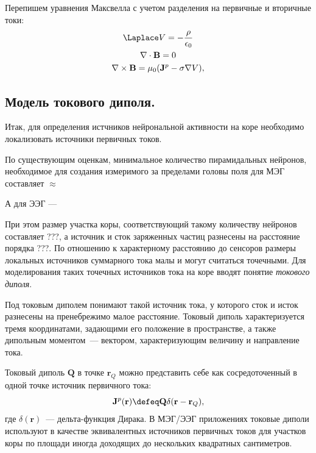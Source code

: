 Перепишем уравнения Максвелла с учетом разделения на первичные и вторичные токи:
\begin{gather}
    \Laplace V = -\frac{\rho}{\epsilon_0} \label{eq:max_quasi_prim_sec1} \\
    \nabla \cdot \mathbf{B} = 0 \label{eq:max_quasi_prim_sec2} \\
    \nabla \times \mathbf{B} = \mu_0 (\mathbf{J}^p - \sigma \nabla V) \label{eq:max_quasi_prim_sec3},
\end{gather}

\subsection{Модель токового диполя.}

Итак, для определения истчников нейрональной активности на коре необходимо
локализовать источники первичных токов.

По существующим оценкам, минимальное количество пирамидальных нейронов,
необходимое для создания измеримого за пределами головы поля для МЭГ составляет
$\approx$

А для ЭЭГ ---

При этом размер участка коры, соответствующий такому количеству нейронов
составляет ???, а источник и сток заряженных частиц разнесены на расстояние
порядка ???. По отношению к характерному расстоянию до сенсоров размеры
локальных источников суммарного тока малы и могут считаться точечными.  Для
моделирования таких точечных источников тока на коре вводят понятие
\emph{токового диполя}.

Под токовым диполем понимают такой источник тока, у которого сток и исток
разнесены на пренебрежимо малое расстояние.  Токовый диполь характеризуется
тремя координатами, задающими его положение в пространстве, а также дипольным
моментом~--- вектором, характеризующим величину и направление тока.

Токовый диполь $\mathbf{Q}$ в точке $\mathbf{r}_Q$ можно представить себе как сосредоточенный
в одной точке источник первичного тока:
\begin{equation}
    \mathbf{J}^p(\mathbf{r}) \defeq \mathbf{Q}\delta(\mathbf{r} - \mathbf{r}_Q),
    \label{eq:cur_dip_def}
\end{equation}
где $\delta(\mathbf{r})$~--- дельта-функция Дирака.
В МЭГ/ЭЭГ приложениях токовые диполи используют в качестве эквивалентных источников первичных токов для
участков коры по площади иногда доходящих до нескольких квадратных сантиметров.

